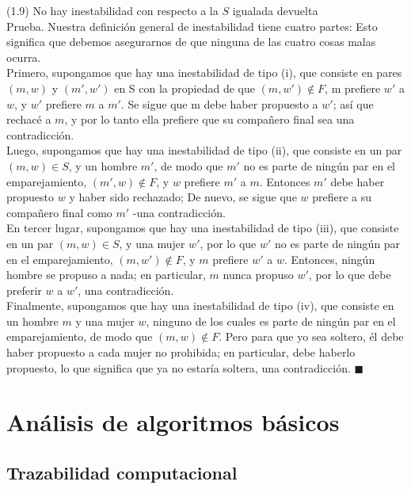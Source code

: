 \documentclass[a4paper]{article}
\begin{document}
(1.9) No hay inestabilidad con respecto a la $S$ igualada devuelta\\

Prueba. Nuestra definición general de inestabilidad tiene cuatro partes: Esto significa que debemos asegurarnos de que ninguna de las cuatro cosas malas ocurra.\\

Primero, supongamos que hay una inestabilidad de tipo (i), que consiste en pares $(m,w)$ y $(m',w')$ en S con la propiedad de que $(m,w')∉F$, m prefiere $w'$ a $w$, y $w'$ prefiere $m$ a $m'$. Se sigue que m debe haber propuesto a $w'$; así que rechacé a $m$, y por lo tanto ella prefiere que su compañero final sea una contradicción.\\

Luego, supongamos que hay una inestabilidad de tipo (ii), que consiste en un par $(m,w)∈S$, y un hombre $m'$, de modo que $m'$ no es parte de ningún par en el emparejamiento, $(m',w)∉F$, y $w$ prefiere $m'$ a $m$. Entonces $m'$ debe haber propuesto $w$ y haber sido rechazado; De nuevo, se sigue que $w$ prefiere a su compañero final como $m'$ -una contradicción.\\

En tercer lugar, supongamos que hay una inestabilidad de tipo (iii), que consiste en un par $(m,w)∈S$, y una mujer $w'$, por lo que $w'$ no es parte de ningún par en el emparejamiento, $(m,w')∉F$, y $m$ prefiere $w'$ a $w$. Entonces, ningún hombre se propuso a nada; en particular, $m$ nunca propuso $w'$, por lo que debe preferir $w$ a $w'$, una contradicción.\\

Finalmente, supongamos que hay una inestabilidad de tipo (iv), que consiste en un hombre $m$ y una mujer $w$, ninguno de los cuales es parte de ningún par en el emparejamiento, de modo que $(m,w)∉F$. Pero para que yo sea soltero, él debe haber propuesto a cada mujer no prohibida; en particular, debe haberlo propuesto, lo que significa que ya no estaría soltera, una contradicción. $ \blacksquare $\\


\newpage

\section{Análisis de algoritmos básicos}

\subsection{Trazabilidad computacional}
\end{document}
